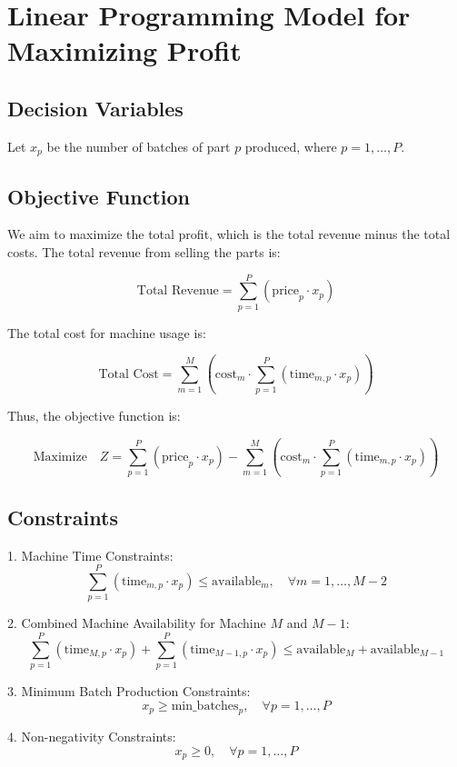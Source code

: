 \documentclass{article}
\begin{document}
\section*{Linear Programming Model for Maximizing Profit}

\subsection*{Decision Variables}
Let \( x_p \) be the number of batches of part \( p \) produced, where \( p = 1, \ldots, P \).

\subsection*{Objective Function}
We aim to maximize the total profit, which is the total revenue minus the total costs. The total revenue from selling the parts is:

\[
\text{Total Revenue} = \sum_{p=1}^P (\text{price}_p \cdot x_p)
\]

The total cost for machine usage is:

\[
\text{Total Cost} = \sum_{m=1}^M \left( \text{cost}_m \cdot \sum_{p=1}^P \left( \text{time}_{m,p} \cdot x_p \right) \right)
\]

Thus, the objective function is:

\[
\text{Maximize} \quad Z = \sum_{p=1}^P (\text{price}_p \cdot x_p) - \sum_{m=1}^M \left( \text{cost}_m \cdot \sum_{p=1}^P \left( \text{time}_{m,p} \cdot x_p \right) \right)
\]

\subsection*{Constraints}
1. Machine Time Constraints:
   \[
   \sum_{p=1}^P \left( \text{time}_{m,p} \cdot x_p \right) \leq \text{available}_m, \quad \forall m = 1, \ldots, M-2 
   \]

2. Combined Machine Availability for Machine \( M \) and \( M-1 \):
   \[
   \sum_{p=1}^P \left( \text{time}_{M,p} \cdot x_p \right) + \sum_{p=1}^P \left( \text{time}_{M-1,p} \cdot x_p \right) \leq \text{available}_M + \text{available}_{M-1}
   \]

3. Minimum Batch Production Constraints:
   \[
   x_p \geq \text{min\_batches}_p, \quad \forall p = 1, \ldots, P
   \]

4. Non-negativity Constraints:
   \[
   x_p \geq 0, \quad \forall p = 1, \ldots, P
   \]
\end{document}
